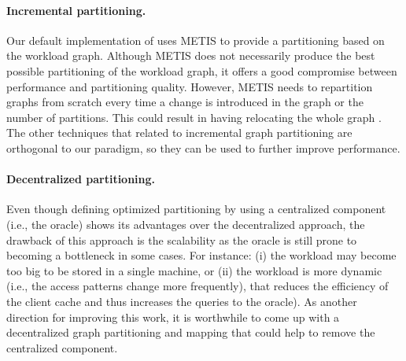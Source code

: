 \paragraph{Incremental partitioning.} Our default implementation of \dynastar
uses METIS \cite{Abou-Rjeili:2006} to provide a partitioning based on the
workload graph. Although METIS does not necessarily produce the best possible
partitioning of the workload graph, it offers a good compromise between
performance and partitioning quality. However, METIS needs to repartition graphs
from scratch every time a change is introduced in the graph or the number of
partitions. This could result in having \dynastar relocating the whole graph
\cite{SerafiniTEPAS16}. The other techniques that related to incremental graph
partitioning are orthogonal to our paradigm, so they can be used to further
improve \dynastar performance.


\paragraph{Decentralized partitioning.} Even though defining optimized
partitioning by using a centralized component (i.e., the oracle) shows its
advantages over the decentralized approach, the drawback of this approach is the
scalability as the oracle is still prone to becoming a bottleneck in some cases.
For instance:  (i) the workload may become too big to be stored in a single
machine, or (ii) the workload is more dynamic (i.e., the access patterns change
more frequently), that reduces the efficiency of the client cache and thus
increases the queries to the oracle). As another direction for improving this
work, it is worthwhile to come up with a decentralized graph partitioning and
mapping that could help to remove the centralized component.

